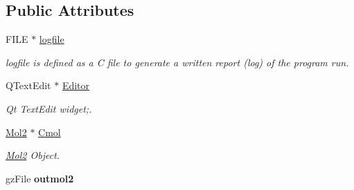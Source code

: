 \subsection*{Public Attributes}
\begin{DoxyCompactItemize}
\item 
\hypertarget{classQtWriter_a044bb96d71354b34c4a6ba47c3461d42}{
FILE $\ast$ \hyperlink{classQtWriter_a044bb96d71354b34c4a6ba47c3461d42}{logfile}}
\label{classQtWriter_a044bb96d71354b34c4a6ba47c3461d42}

\begin{DoxyCompactList}\small\item\em logfile is defined as a C file to generate a written report (log) of the program run. \item\end{DoxyCompactList}\item 
\hypertarget{classQtWriter_aef069987d2d9b05bb8df3019ff118efb}{
QTextEdit $\ast$ \hyperlink{classQtWriter_aef069987d2d9b05bb8df3019ff118efb}{Editor}}
\label{classQtWriter_aef069987d2d9b05bb8df3019ff118efb}

\begin{DoxyCompactList}\small\item\em Qt TextEdit widget;. \item\end{DoxyCompactList}\item 
\hypertarget{classQtWriter_af3696b3d26d4be8fce7ab77f2773b9e2}{
\hyperlink{classMol2}{Mol2} $\ast$ \hyperlink{classQtWriter_af3696b3d26d4be8fce7ab77f2773b9e2}{Cmol}}
\label{classQtWriter_af3696b3d26d4be8fce7ab77f2773b9e2}

\begin{DoxyCompactList}\small\item\em \hyperlink{classMol2}{Mol2} Object. \item\end{DoxyCompactList}\item 
\hypertarget{classQtWriter_a41ae23e5a7e0c18505f3a7c654c672b7}{
gzFile {\bfseries outmol2}}
\label{classQtWriter_a41ae23e5a7e0c18505f3a7c654c672b7}

\end{DoxyCompactItemize}


